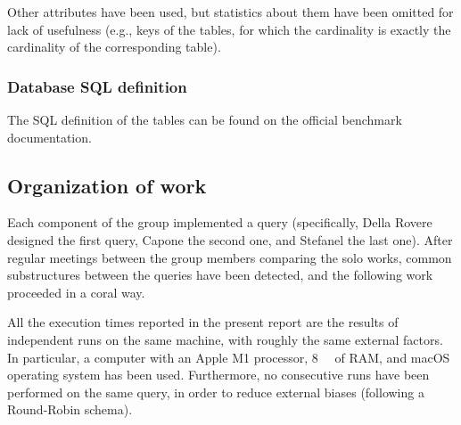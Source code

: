 Other attributes have been used, but statistics about them have been omitted for lack of usefulness (e.g., keys of the tables, for which the cardinality is exactly the cardinality of the corresponding table).

\subsubsection{Database SQL definition}

The SQL definition of the tables can be found on the official benchmark documentation. \cite{TPC-H}

\subsection{Organization of work}
\label{subsection:organizationwork}

Each component of the group implemented a query (specifically, Della Rovere designed the first query, Capone the second one, and Stefanel the last one).
After regular meetings between the group members comparing the solo works, common substructures between the queries have been detected, and the following work proceeded in a coral way.

All the execution times reported in the present report are the results of independent runs on the same machine, with roughly the same external factors. In particular, a computer with an Apple M1 processor, \SI{8}{\giga\byte} of RAM, and macOS operating system has been used.
Furthermore, no consecutive runs have been performed on the same query, in order to reduce external biases (following a Round-Robin schema).